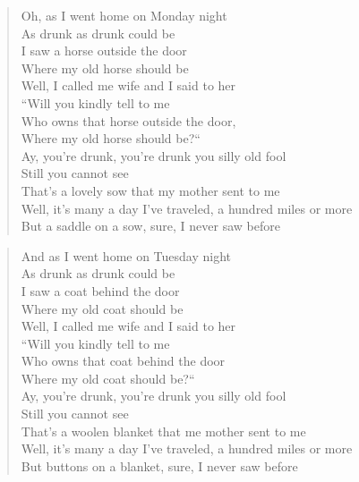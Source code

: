 \documentclass[8pt,twoside]{extarticle}
\newenvironment{xverse}{
	\interlinepenalty 10000
	\begin{verse}
	\begin{minipage}{\linewidth}
	\parskip 5pt
	\vspace{-6pt}
	}
	{
	\end{minipage}
	\end{verse}
	\penalty 0
	\vspace{-6pt}
	}
\begin{document}
\begin{xverse}
Oh, as I went home on Monday night \\
As drunk as drunk could be \\
I saw a horse outside the door \\
Where my old horse should be \\
Well, I called me wife and I said to her \\
“Will you kindly tell to me \\
Who owns that horse outside the door, \\
Where my old horse should be?“ \\
Ay, you’re drunk, you’re drunk you silly old fool \\
Still you cannot see \\
That’s a lovely sow that my mother sent to me \\
Well, it’s many a day I’ve traveled, a hundred miles or more \\
But a saddle on a sow, sure, I never saw before \\
\end{xverse}

\begin{xverse}
And as I went home on Tuesday night \\
As drunk as drunk could be \\
I saw a coat behind the door \\
Where my old coat should be \\
Well, I called me wife and I said to her \\
“Will you kindly tell to me \\
Who owns that coat behind the door \\
Where my old coat should be?“ \\
Ay, you’re drunk, you’re drunk you silly old fool \\
Still you cannot see \\
That’s a woolen blanket that me mother sent to me \\
Well, it’s many a day I’ve traveled, a hundred miles or more \\
But buttons on a blanket, sure, I never saw before \\
\end{xverse}
\end{document}

